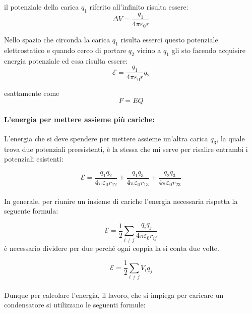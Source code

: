 il potenziale della carica $q_1$ riferito all'infinito risulta essere:
\begin{equation}
    \Delta V  = \frac{q_1}{4\pi \varepsilon_0 r}
\end{equation}

Nello spazio che circonda la carica $q_1$ risulta esserci questo potenziale elettrostatico e quando cerco di portare $q_2$ vicino a $q_1$ gli sto facendo acquisire energia potenziale ed essa risulta essere:
\begin{equation}
    \mathcal{E} = \frac{q_1}{4\pi \varepsilon_0 r}q_2 
\end{equation}

esattamente come
\begin{equation*}
    F = E Q
\end{equation*}

\paragraph{L'energia per mettere assieme più cariche:\\}

L'energia che si deve spendere per mettere assieme un'altra carica $q_3$, la quale trova due potenziali preesistenti, è la stessa che mi serve per risalire entrambi i potenziali esistenti:

\begin{equation*}
    \mathcal{E} = \frac{q_1q_2}{4\pi \varepsilon_0 r_{12}} + \frac{q_1q_3}{4\pi \varepsilon_0 r_{13}} + \frac{q_2q_3}{4\pi \varepsilon_0 r_{23}}
\end{equation*}

\paragraph{}

In generale, per riunire un insieme di cariche l'energia necessaria rispetta la seguente formula:

\begin{equation*}
    \mathcal{E} = \frac{1}{2}\sum_{i\neq j} \frac{q_iq_j}{4\pi \varepsilon_0 r_{ij}} 
\end{equation*}
è necessario dividere per due perché ogni coppia la si conta due volte.

\begin{equation*}
    \mathcal{E} = \frac{1}{2}\sum_{i\neq j} V_iq_j
\end{equation*}


\paragraph{}
Dunque per calcolare l'energia, il lavoro, che si impiega per caricare un condensatore si utilizzano le seguenti formule:

